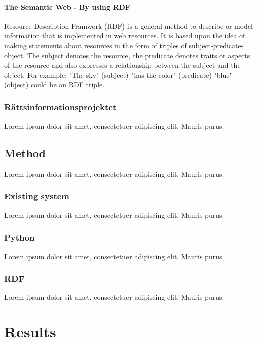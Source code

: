 \documentclass[a4paper,11pt]{kth-mag}
\begin{document}
\subsection{The Semantic Web - By using RDF} Resource Description Framwork
(RDF) is a general method to describe or model information that is implemented
in web resources. It is based upon the idea of making statements about
resources in the form of triples of subject-predicate-object. The subject
denotes the resource, the predicate denotes traits or aspects of the resource
and also expresses a relationship between the subject and the object. For
example: "The sky" (subject) "has the color" (predicate) "blue" (object) could
be an RDF triple.

\section{Rättsinformationsprojektet}
Lorem ipsum dolor sit amet, consectetuer adipiscing elit. Mauris
purus. 

\chapter{Method}

Lorem ipsum dolor sit amet, consectetuer adipiscing elit. Mauris
purus. 

\section{Existing system}

Lorem ipsum dolor sit amet, consectetuer adipiscing elit. Mauris
purus. 

\section{Python}

Lorem ipsum dolor sit amet, consectetuer adipiscing elit. Mauris
purus. 

\section{RDF}

Lorem ipsum dolor sit amet, consectetuer adipiscing elit. Mauris
purus. 

\part{Results}
\end{document}
